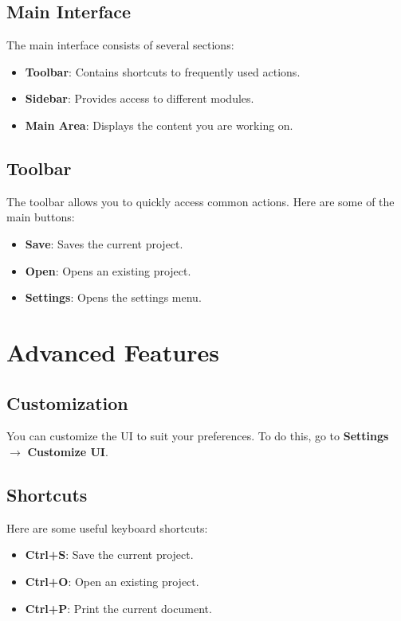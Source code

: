 \documentclass{book}
\begin{document}
\section{Main Interface}
The main interface consists of several sections:

\begin{itemize}
    \item \textbf{Toolbar}: Contains shortcuts to frequently used actions.
    \item \textbf{Sidebar}: Provides access to different modules.
    \item \textbf{Main Area}: Displays the content you are working on.
\end{itemize}

\section{Toolbar}
The toolbar allows you to quickly access common actions. Here are some of the main buttons:

\begin{itemize}
    \item \textbf{Save}: Saves the current project.
    \item \textbf{Open}: Opens an existing project.
    \item \textbf{Settings}: Opens the settings menu.
\end{itemize}

\chapter{Advanced Features}
\section{Customization}
You can customize the UI to suit your preferences. To do this, go to \textbf{Settings} $\rightarrow$ \textbf{Customize UI}.

\section{Shortcuts}
Here are some useful keyboard shortcuts:

\begin{itemize}
    \item \textbf{Ctrl+S}: Save the current project.
    \item \textbf{Ctrl+O}: Open an existing project.
    \item \textbf{Ctrl+P}: Print the current document.
\end{itemize}
\end{document}
